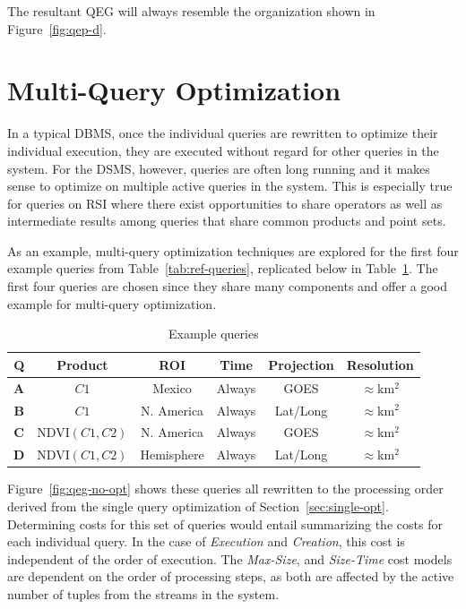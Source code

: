 \documentclass{ucdthesis}       %
\newcommand{\qry}[1]{{\bf #1}}
\begin{document}
The resultant \ac{QEG} will always resemble the organization shown in
Figure~\ref{fig:qep-d}.

\section{Multi-Query Optimization}
\label{sec:multi-opt}

In a typical \ac{DBMS}, once the individual queries are rewritten to
optimize their individual execution, they are executed without regard
for other queries in the system.  For the \ac{DSMS}, however, queries
are often long running and it makes sense to optimize on multiple
active queries in the system.  This is especially true for queries on
\ac{RSI} where there exist opportunities to share operators as well as
intermediate results among queries that share common products and
point sets.

As an example, multi-query optimization techniques are explored for
the first four example queries from Table~\ref{tab:ref-queries},
replicated below in Table~\ref{tab:multi-example}.  The first four
queries are chosen since they share many components and offer a good
example for multi-query optimization.
%
\begin{table}[htb]
  \centering
  \caption{Example queries}
  \begin{tabular}[b]{c|c|c|c|c|c}
    {\bf Q } & {\bf Product} & {\bf \ac{ROI}} & {\bf Time} & {\bf Projection} & {\bf Resolution} \\
    \hline \hline
    \qry{A} & $C1$ & Mexico & Always & GOES &$\approx$\unit[1]{km$^2$} \\
    \qry{B} & $C1$ & N. America & Always & Lat/Long & $\approx$\unit[4]{km$^2$} \\
    \qry{C} & NDVI$(C1,C2)$ & N. America & Always & GOES & $\approx$\unit[4]{km$^2$} \\
    \qry{D} & NDVI$(C1,C2)$ & Hemisphere & Always & Lat/Long & $\approx$\unit[8]{km$^2$} \\
  \end{tabular}
  \label{tab:multi-example}
\end{table}

Figure~\ref{fig:qeg-no-opt} shows these queries all rewritten to the
processing order derived from the single query optimization of
Section~\ref{sec:single-opt}.  Determining costs for this set of
queries would entail summarizing the costs for each individual query.
In the case of \emph{Execution} and \emph{Creation}, this cost is
independent of the order of execution.  The \emph{Max-Size}, and
\emph{Size-Time} cost models are dependent on the order of processing
steps, as both are affected by the active number of tuples from the
streams in the system.
\end{document}
